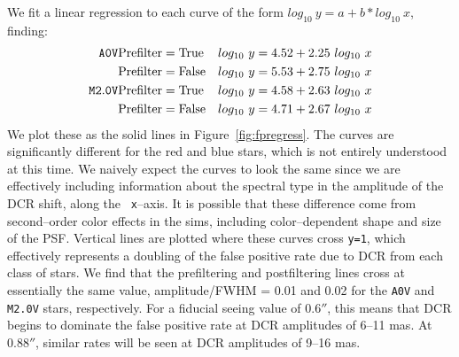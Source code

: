 \documentclass[DM,toc]{lsstdoc}
\begin{document}
We fit a linear regression to each curve of the form $log_{10}~y = a +
b * log_{10}~x$, finding:
\begin{eqnarray}
{\tt A0V}   & {\rm Prefilter=True}  & log_{10}~y = 4.52 + 2.25 ~log_{10}~x \\ \nonumber
            & {\rm Prefilter=False} & log_{10}~y = 5.53 + 2.75 ~log_{10}~x \\ \nonumber
{\tt M2.0V} & {\rm Prefilter=True}  & log_{10}~y = 4.58 + 2.63 ~log_{10}~x \\ \nonumber
            & {\rm Prefilter=False} & log_{10}~y = 4.71 + 2.67 ~log_{10}~x
\end{eqnarray}
We plot these as the solid lines in Figure~\ref{fig:fpregress}.  The
curves are significantly different for the red and blue stars, which
is not entirely understood at this time.  We naively expect the curves
to look the same since we are effectively including information about
the spectral type in the amplitude of the DCR shift, along the {\tt
  x}--axis.  It is possible that these difference come from
second--order color effects in the sims, including color--dependent
shape and size of the PSF.  Vertical lines are plotted where these
curves cross {\tt y=1}, which effectively represents a doubling of the
false positive rate due to DCR from each class of stars.  We find that
the prefiltering and postfiltering lines cross at essentially the same
value, amplitude/FWHM = 0.01 and 0.02 for the {\tt A0V} and {\tt
  M2.0V} stars, respectively.  For a fiducial seeing value of $0.6''$,
this means that DCR begins to dominate the false positive rate at DCR
amplitudes of 6--11 mas.  At $0.88''$, similar rates will be seen at
DCR amplitudes of 9--16 mas.
\end{document}
